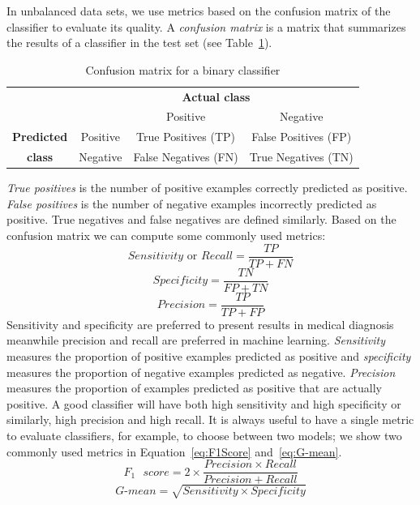 In unbalanced data sets, we use metrics based on the confusion matrix of the classifier to evaluate its quality. A \emph{confusion matrix} is a matrix that summarizes the results of a classifier in the test set (see Table~\ref{tab:ConfusionMatrix}).
\begin{table}[h]
	\centering
	\begin{tabular}{cc|c|c|}
		&\multicolumn{3}{c}{\textbf{Actual class}}\\
		&&Positive & Negative \\
		\cline{2-4}
		\textbf{Predicted}&Positive&True Positives (TP)& False Positives (FP)\\
		\cline{2-4}
		\textbf{class}&Negative&False Negatives (FN) & True Negatives (TN)\\
		\cline{2-4}
	\end{tabular}
	\caption{Confusion matrix for a binary classifier}
	\label{tab:ConfusionMatrix}
\end{table}
\emph{True positives} is the number of positive examples correctly predicted as positive. \emph{False positives} is the number of negative examples incorrectly predicted as positive. True negatives and false negatives are defined similarly. Based on the confusion matrix we can compute some commonly used metrics:
\begin{equation}
	Sensitivity \text{ or } Recall = \frac{TP}{TP+FN}
\end{equation}
\begin{equation}
	Specificity = \frac{TN}{FP+TN}
\end{equation}
\begin{equation}
	Precision = \frac{TP}{TP+FP}
\end{equation}
Sensitivity and specificity are preferred to present results in medical diagnosis meanwhile precision and recall are preferred in machine learning. \emph{Sensitivity} measures the proportion of positive examples predicted as positive and \emph{specificity} measures the proportion of negative examples predicted as negative. \emph{Precision} measures the proportion of examples predicted as positive that are actually positive. A good classifier will have both high sensitivity and high specificity or similarly, high precision and high recall. It is always useful to have a single metric to evaluate classifiers, for example, to choose between two models; we show two commonly used metrics in Equation~\ref{eq:F1Score} and~\ref{eq:G-mean}.
\begin{equation}
	F_1\text{ }score = 2\times\frac{Precision \times Recall}{Precision + Recall}
	\label{eq:F1Score}
\end{equation}
\begin{equation}
	G\text{-}mean = \sqrt{Sensitivity \times Specificity}
	\label{eq:G-mean}
\end{equation}

